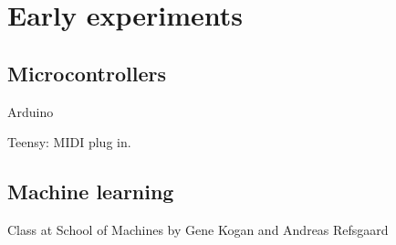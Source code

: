 \chapter{Early experiments}

\section{Microcontrollers}

Arduino

Teensy: MIDI plug in.

\section{Machine learning}

Class at School of Machines by Gene Kogan and Andreas Refsgaard
